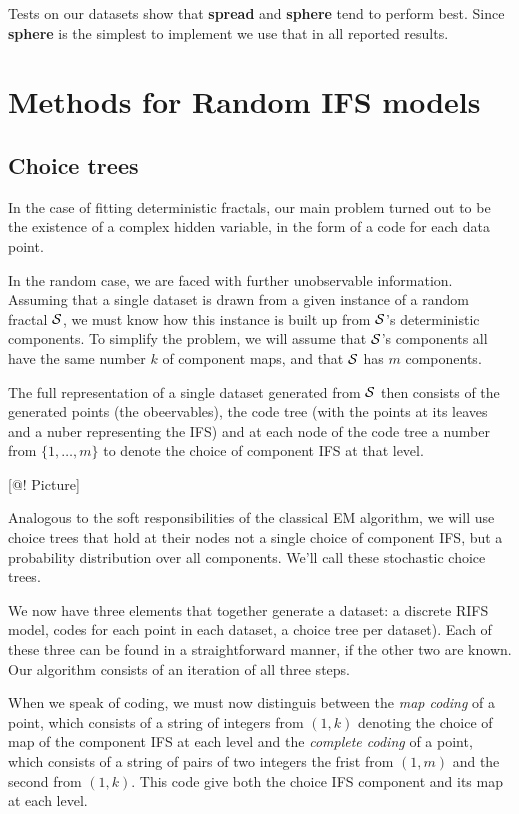 \documentclass[10pt,a4paper,oneside]{article}
\theoremstyle{definition}
\begin{document}
Tests on our datasets show that \textbf{spread} and \textbf{sphere} tend to perform best. Since \textbf{sphere} is the simplest to implement  we use that in all reported results.

\section*{Methods for Random IFS models}

\subsection*{Choice trees}

In the case of fitting deterministic fractals, our main problem turned out to be the existence of a complex hidden variable, in the form of a code for each data point.

In the random case, we are faced with further unobservable information. Assuming that a single dataset is drawn from a given instance of a random fractal ${\cal S}$, we must know how this instance is built up from ${\cal S}$'s deterministic components. To simplify the problem, we will assume that ${\cal S}$'s components all have the same number $k$ of component maps, and that ${\cal S}$ has $m$ components.

The full representation of a single dataset generated from ${\cal S}$ then consists of the generated points (the obeervables), the code tree (with the points at its leaves and a nuber representing the IFS) and at each node of the code tree a number from $\{1, \ldots, m\}$ to denote the choice of component IFS at that level.
 
[@! Picture]

Analogous to the soft responsibilities of the classical EM algorithm, we will use choice trees that hold at their nodes not a single choice of component IFS, but a probability distribution over all components. We'll call these stochastic choice trees.

We now have three elements that together generate a dataset: a discrete RIFS model, codes for each point in each dataset, a choice tree per dataset). Each of these three can be found in a straightforward manner, if the other two are known. Our algorithm consists of an iteration of all three steps.

When we speak of coding, we must now distinguis between the \emph{map coding} of a point, which consists of a string of integers from $(1,k)$ denoting the choice of map of the component IFS at each level and the \emph{complete coding} of a point, which consists of a string of pairs of two integers the frist from $(1, m)$ and the second from $(1,k)$. This code give both the choice IFS component and its map at each level.
\end{document}
